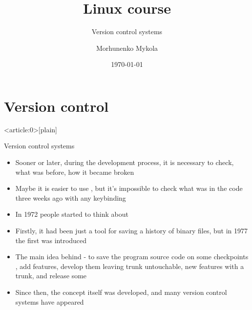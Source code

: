 \documentclass[usenames,dvipsnames,10pt,aspectratio=169]{beamer}
\title{Linux course}
\subtitle{Version control systems}
\date[\today]{\small\today}
\author[Morhunenko Mykola]{Morhunenko Mykola}
\institute{APPS@UCU}
\begin{document}
\begin{frame}
\titlepage
\end{frame}

\begin{frame}{\contentsname}
    \tableofcontents
\end{frame}

\section{Version control}
{ %
    \begin{frame}<article:0>[plain]
     \end{frame}
}

\begin{frame}{Version control systems}    
    \begin{itemize}
        \item Sooner or later, during the development process, it is necessary to check, 
        what was before, how it became broken
        \item Maybe it is easier to use , but it's impossible to check what was in the code three weeks 
        ago with any keybinding
        \item In 1972 people started to think about 
        \item Firstly, it had been just a tool for saving a history of binary files, but in 1977 
        the first  was introduced
        \item The main idea behind - to save the program source code on some checkpoints
        , add features, develop them leaving trunk untouchable,  new features with a trunk, and release some 
        \item Since then, the concept itself was developed, and many version control systems have appeared
    \end{itemize}
\end{frame}
\end{document}
